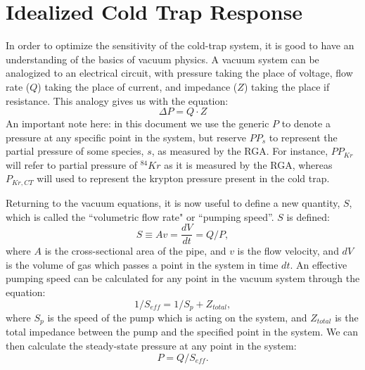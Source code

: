 \documentclass[12pt]{article}
\begin{document}
\section{Idealized Cold Trap Response}
\label{sec:vaceq}
In order to optimize the sensitivity of the cold-trap system, it is good to have an understanding of the basics of vacuum physics. A vacuum system can be analogized to an electrical circuit, with pressure taking the place of voltage, flow rate ($Q$) taking the place of current, and impedance ($Z$) taking the place if resistance. This analogy gives us with the equation:
\begin{equation}
\label{eq:vaclaw1}
\Delta P = Q\cdot Z
\end{equation} 
An important note here: in this document we use the generic $P$ to denote a pressure at any specific point in the system, but reserve $PP_{s}$ to represent the partial pressure of some species, $s$, as measured by the RGA. For instance, $PP_{Kr}$ will refer to partial pressure of $^{84}Kr$ as it is measured by the RGA, whereas $P_{Kr,CT}$ will used to represent the krypton pressure present in the cold trap. 

Returning to the vacuum equations, it is now useful to define a new quantity, $S$, which is called the ``volumetric flow rate" or ``pumping speed''. $S$ is defined: 
\begin{equation}
\label{eq:volflow}
S \equiv Av = \frac{dV}{dt}=Q/P, 
\end{equation}
where $A$ is the cross-sectional area of the pipe, and $v$ is the flow velocity, and $dV$ is the volume of gas which passes a point in the system in time $dt$. An effective pumping speed can be calculated for any point in the vacuum system through the equation:
\begin{equation}
\label{ep:vacimp}
1/S_{eff} = 1/S_{p}+Z_{total}, 
\end{equation}
where $S_{p}$ is the speed of the pump which is acting on the system, and $Z_{total}$ is the total impedance between the pump and the specified point in the system. We can then calculate the steady-state pressure at any point in the system\cite{vac_eq}:
\begin{equation}
\label{eq:vaclaw2}
P=Q/S_{eff}.
\end{equation}
\end{document}
